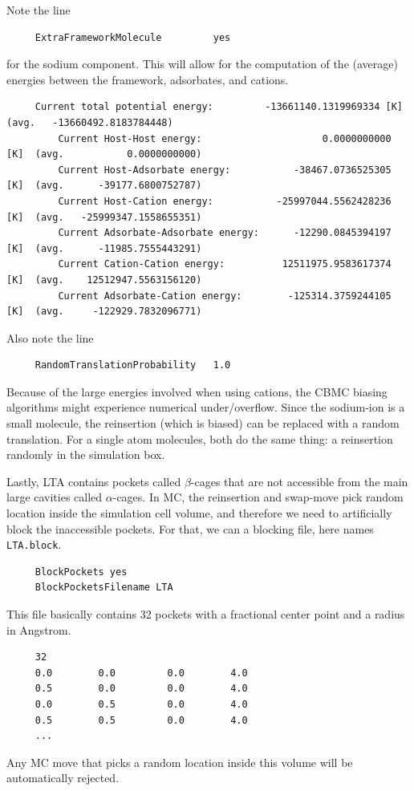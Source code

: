 \noindent
Note the line
\begin{tiny}
\begin{verbatim}
     ExtraFrameworkMolecule         yes
\end{verbatim}
\end{tiny}
for the sodium component. This will allow for the computation of the (average) energies between the framework, adsorbates, and cations.
\begin{tiny}
\begin{verbatim}
     Current total potential energy:         -13661140.1319969334 [K]  (avg.   -13660492.8183784448)
         Current Host-Host energy:                     0.0000000000 [K]  (avg.           0.0000000000)
         Current Host-Adsorbate energy:           -38467.0736525305 [K]  (avg.      -39177.6800752787)
         Current Host-Cation energy:           -25997044.5562428236 [K]  (avg.   -25999347.1558655351)
         Current Adsorbate-Adsorbate energy:      -12290.0845394197 [K]  (avg.      -11985.7555443291)
         Current Cation-Cation energy:          12511975.9583617374 [K]  (avg.    12512947.5563156120)
         Current Adsorbate-Cation energy:        -125314.3759244105 [K]  (avg.     -122929.7832096771)
\end{verbatim}
\end{tiny}
Also note the line
\begin{tiny}
\begin{verbatim}
     RandomTranslationProbability   1.0
\end{verbatim}
\end{tiny}
Because of the large energies involved when using cations, the CBMC biasing algorithms might experience numerical under/overflow.
Since the sodium-ion is a small molecule, the reinsertion (which is biased) can be replaced with a random translation.
For a single atom molecules, both do the same thing: a reinsertion randomly in the simulation box.

\noindent
Lastly, LTA contains pockets called $\beta$-cages that are not accessible from the main large cavities called $\alpha$-cages.
In MC, the reinsertion and swap-move pick random location inside the simulation cell volume, and therefore we need to artificially block
the inaccessible pockets. For that, we can a blocking file, here names \verb+LTA.block+.
\begin{tiny}
\begin{verbatim}
     BlockPockets yes 
     BlockPocketsFilename LTA
\end{verbatim}
This file basically contains 32 pockets with a fractional center point and a radius in Angstrom.
\end{tiny}
\begin{tiny}
\begin{verbatim}
     32
     0.0        0.0         0.0        4.0
     0.5        0.0         0.0        4.0
     0.0        0.5         0.0        4.0
     0.5        0.5         0.0        4.0
     ...
\end{verbatim}
\end{tiny}
Any MC move that picks a random location inside this volume will be automatically rejected.

